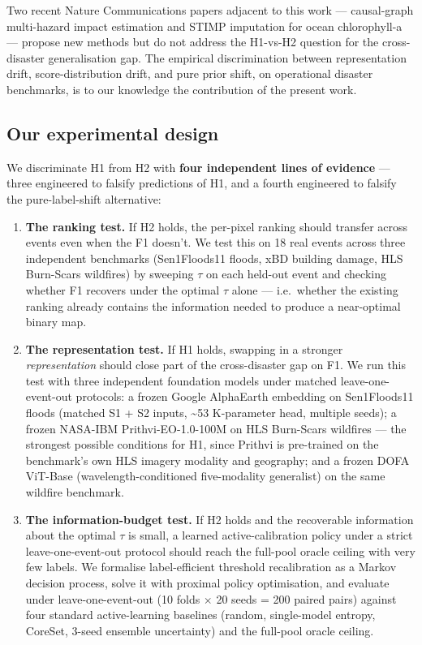 \documentclass[sn-nature,lineno]{sn-jnl}
\theoremstyle{thmstyleone}
\theoremstyle{thmstyletwo}
\theoremstyle{thmstylethree}
\begin{document}
Two recent Nature Communications papers \cite{xu2022causal,zhang2025stimp} adjacent
to this work --- causal-graph multi-hazard impact estimation and STIMP
imputation for ocean chlorophyll-a --- propose new methods but do not
address the H1-vs-H2 question for the cross-disaster generalisation
gap. The empirical discrimination between representation drift,
score-distribution drift, and pure prior shift, on operational
disaster benchmarks, is to our knowledge the contribution of the
present work.

\subsection{Our experimental design}\label{our-experimental-design}

We discriminate H1 from H2 with \textbf{four independent lines of evidence} ---
three engineered to falsify predictions of H1, and a fourth engineered
to falsify the pure-label-shift alternative:

\begin{enumerate}
\def\labelenumi{\arabic{enumi}.}
\item
  \textbf{The ranking test.} If H2 holds, the per-pixel ranking should
  transfer across events even when the F1 doesn't. We test this on
  18 real events across three independent benchmarks (Sen1Floods11
  floods, xBD building damage, HLS Burn-Scars wildfires) by sweeping $\tau$
  on each held-out event and checking whether F1 recovers under the
  optimal $\tau$ alone --- i.e.~whether the existing ranking already contains
  the information needed to produce a near-optimal binary map.
\item
  \textbf{The representation test.} If H1 holds, swapping in a stronger
  \emph{representation} should close part of the cross-disaster gap on F1.
  We run this test with three independent foundation models under
  matched leave-one-event-out protocols: a frozen Google AlphaEarth
  embedding on Sen1Floods11 floods (matched S1 + S2 inputs,
  \textasciitilde53 K-parameter head, multiple seeds); a frozen NASA-IBM
  Prithvi-EO-1.0-100M on HLS Burn-Scars wildfires --- the strongest
  possible conditions for H1, since Prithvi is pre-trained on the
  benchmark's own HLS imagery modality and geography; and a frozen
  DOFA ViT-Base (wavelength-conditioned five-modality generalist) on
  the same wildfire benchmark.
\item
  \textbf{The information-budget test.} If H2 holds and the recoverable
  information about the optimal $\tau$ is small, a learned active-calibration
  policy under a strict leave-one-event-out protocol should reach the
  full-pool oracle ceiling with very few labels. We formalise
  label-efficient threshold recalibration as a Markov decision process,
  solve it with proximal policy optimisation, and evaluate under
  leave-one-event-out (10 folds $\times$ 20 seeds = 200 paired pairs) against
  four standard active-learning baselines (random, single-model
  entropy, CoreSet, 3-seed ensemble uncertainty) and the full-pool
  oracle ceiling.
\end{enumerate}
\end{document}
